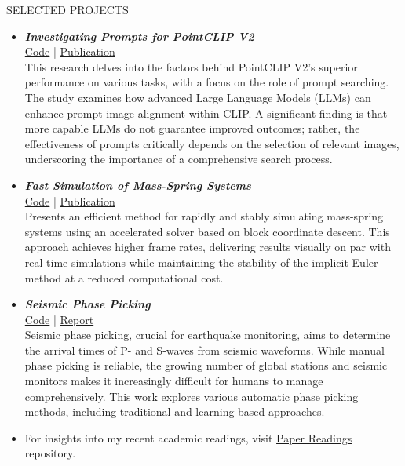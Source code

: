 \documentclass{resume} %
\begin{document}
\begin{rSection}{SELECTED PROJECTS}

\begin{itemize}
    \item \textbf{\textit{Investigating Prompts for PointCLIP V2}} \\
    \href{https://github.com/wangyuchen333/InvestigateOnPromptsForPointCLIPV2}{Code} | \href{https://arxiv.org/abs/2211.11682}{Publication} \\
    This research delves into the factors behind PointCLIP V2's superior performance on various tasks, with a focus on the role of prompt searching. The study examines how advanced Large Language Models (LLMs) can enhance prompt-image alignment within CLIP. A significant finding is that more capable LLMs do not guarantee improved outcomes; rather, the effectiveness of prompts critically depends on the selection of relevant images, underscoring the importance of a comprehensive search process.
    
    \item \textbf{\textit{Fast Simulation of Mass-Spring Systems}} \\
    \href{https://github.com/wangyuchen333/FastSimulationMass-SpringSystems}{Code} | \href{http://tiantianliu.cn/papers/liu13fast/liu13fast.html}{Publication} \\
    Presents an efficient method for rapidly and stably simulating mass-spring systems using an accelerated solver based on block coordinate descent. This approach achieves higher frame rates, delivering results visually on par with real-time simulations while maintaining the stability of the implicit Euler method at a reduced computational cost.
    

    
    \item \textbf{\textit{Seismic Phase Picking}} \\
    \href{https://github.com/wangyuchen333/SeismicPhasePicking}{Code} |  \href{https://arxiv.org/abs/2410.15907}{Report} \\
    Seismic phase picking, crucial for earthquake monitoring, aims to determine the arrival times of P- and S-waves from seismic waveforms. While manual phase picking is reliable, the growing number of global stations and seismic monitors makes it increasingly difficult for humans to manage comprehensively. This work explores various automatic phase picking methods, including traditional and learning-based approaches.

    \item For insights into my recent academic readings, visit \href{https://github.com/wangyuchen333/paperReadings}{Paper Readings} repository.
\end{itemize}

\end{rSection}
\end{document}
